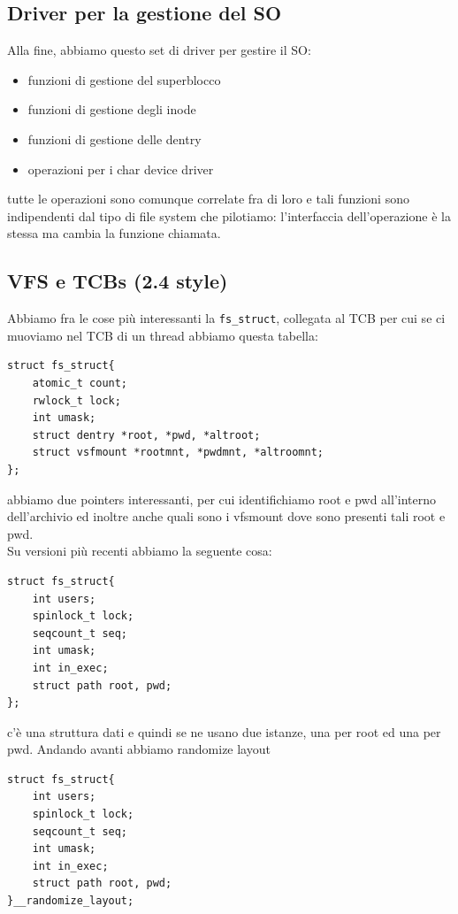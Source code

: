 \documentclass[12pt, oneside]{extbook}
\begin{document}
\subsection{Driver per la gestione del SO}
Alla fine, abbiamo questo set di driver per gestire il SO:
\begin{itemize}
\item funzioni di gestione del superblocco
\item funzioni di gestione degli inode
\item funzioni di gestione delle dentry
\item operazioni per i char device driver
\end{itemize}
tutte le operazioni sono comunque correlate fra di loro e tali funzioni sono indipendenti dal tipo di file system che pilotiamo: l'interfaccia dell'operazione è la stessa ma cambia la funzione chiamata.
\subsection{VFS e TCBs (2.4 style)}
Abbiamo fra le cose più interessanti la \texttt{fs\_struct}, collegata al TCB per cui se ci muoviamo nel TCB di un thread abbiamo questa tabella:
\begin{lstlisting}
struct fs_struct{
	atomic_t count;
	rwlock_t lock;
	int umask;
	struct dentry *root, *pwd, *altroot;
	struct vsfmount *rootmnt, *pwdmnt, *altroomnt;
};
\end{lstlisting}
abbiamo due pointers interessanti, per cui identifichiamo root e pwd all'interno dell'archivio ed inoltre anche quali sono i vfsmount dove sono presenti tali root e pwd.\\Su versioni più recenti abbiamo la seguente cosa:
\begin{lstlisting}
struct fs_struct{
	int users;
	spinlock_t lock;
	seqcount_t seq;
	int umask;
	int in_exec;
	struct path root, pwd;
};
\end{lstlisting}
c'è una struttura dati e quindi se ne usano due istanze, una per root ed una per pwd. Andando avanti abbiamo randomize layout
\begin{lstlisting}
struct fs_struct{
	int users;
	spinlock_t lock;
	seqcount_t seq;
	int umask;
	int in_exec;
	struct path root, pwd;
}__randomize_layout;
\end{lstlisting}
\end{document}
